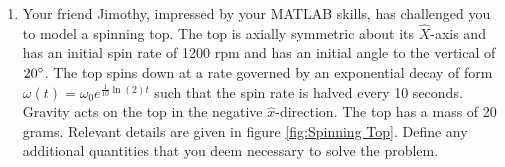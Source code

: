 \documentclass[12pt]{report}
\begin{document}
\begin{enumerate}
    \item Your friend Jimothy, impressed by your MATLAB skills, has challenged you to model a spinning top. The top is axially symmetric about its $\hat{X}$-axis and has an initial spin rate of 1200 rpm and has an initial angle to the vertical of $20\degree$. The top spins down at a rate governed by an exponential decay of form $\omega(t)=\omega_0e^{\frac{1}{10}\ln(2)t}$ such that the spin rate is halved every 10 seconds. Gravity acts on the top in the negative $\hat{x}$-direction. The top has a mass of 20 grams. Relevant details are given in figure \ref{fig:Spinning Top}.
Define any additional quantities that you deem necessary to solve the problem.

\begin{figure}[ht]
    \centering
    




\begin{tikzpicture}[x=0.75pt,y=0.75pt,yscale=-1,xscale=1]


\end{tikzpicture}
\end{figure}
\end{enumerate}
\end{document}
